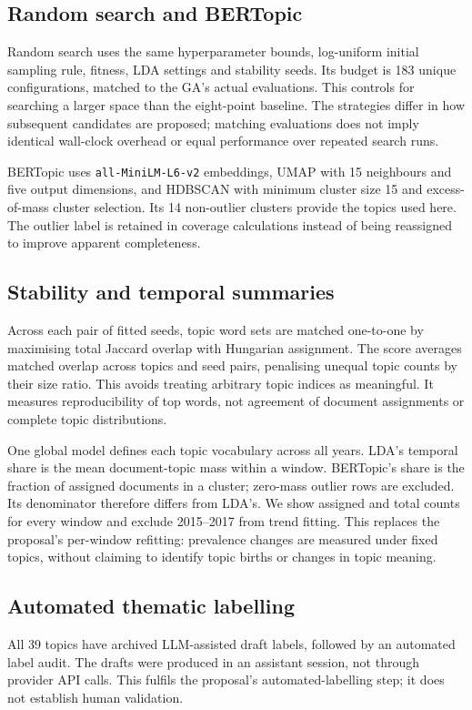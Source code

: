 \subsection{Random search and BERTopic}
Random search uses the same hyperparameter bounds, log-uniform initial sampling rule, fitness,
LDA settings and stability seeds. Its budget is 183 unique configurations, matched to the GA's
actual evaluations. This controls for searching a larger space than the eight-point baseline.
The strategies differ in how subsequent candidates are proposed; matching evaluations does not
imply identical wall-clock overhead or equal performance over repeated search runs.

BERTopic uses \texttt{all-MiniLM-L6-v2} embeddings, UMAP with 15 neighbours and five output
dimensions, and HDBSCAN with minimum cluster size 15 and excess-of-mass cluster selection.
Its 14 non-outlier clusters provide the topics used here. The outlier label is retained in
coverage calculations instead of being reassigned to improve apparent completeness.

\subsection{Stability and temporal summaries}
Across each pair of fitted seeds, topic word sets are matched one-to-one by maximising total
Jaccard overlap with Hungarian assignment. The score averages matched overlap across topics and
seed pairs, penalising unequal topic counts by their size ratio. This avoids treating arbitrary
topic indices as meaningful. It measures reproducibility of top words, not agreement of document
assignments or complete topic distributions.

One global model defines each topic vocabulary across all years. LDA's temporal share is the mean
document-topic mass within a window. BERTopic's share is the fraction of assigned documents in a
cluster; zero-mass outlier rows are excluded. Its denominator therefore differs from LDA's. We
show assigned and total counts for every window and exclude 2015--2017 from trend fitting.
This replaces the proposal's per-window refitting: prevalence changes are measured under fixed
topics, without claiming to identify topic births or changes in topic meaning.

\subsection{Automated thematic labelling}
All 39 topics have archived LLM-assisted draft labels, followed by an automated label audit.
The drafts were produced in an assistant session, not through provider API calls. This fulfils
the proposal's automated-labelling step; it does not establish human validation.

